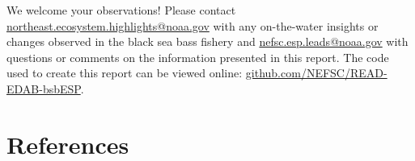\documentclass[
  10pt,
  letterpaper,
  DIV=11,
  numbers=noendperiod]{scrartcl}
\begin{document}
\centering\normalsize

We welcome your observations! Please contact
\url{northeast.ecosystem.highlights@noaa.gov} with any on-the-water
insights or changes observed in the black sea bass fishery and
\url{nefsc.esp.leads@noaa.gov} with questions or comments on the
information presented in this report. The code used to create this
report can be viewed online:
\href{https://github.com/NEFSC/READ-EDAB-bsbESP/tree/main}{github.com/NEFSC/READ-EDAB-bsbESP}.

\newpage
{}

\section{References}\label{references}
\end{document}
